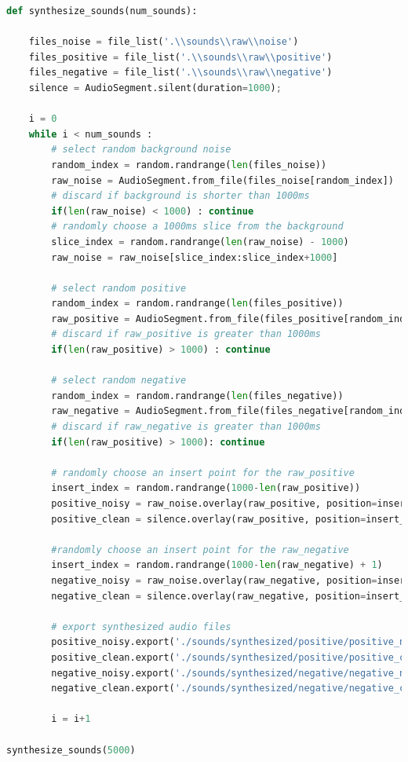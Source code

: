 \documentclass[conference]{IEEEtran}
\begin{document}
\begin{lstlisting}[language=Python]
def synthesize_sounds(num_sounds):  
    
    files_noise = file_list('.\\sounds\\raw\\noise')
    files_positive = file_list('.\\sounds\\raw\\positive')
    files_negative = file_list('.\\sounds\\raw\\negative')
    silence = AudioSegment.silent(duration=1000);

    i = 0
    while i < num_sounds :
        # select random background noise
        random_index = random.randrange(len(files_noise))
        raw_noise = AudioSegment.from_file(files_noise[random_index])
        # discard if background is shorter than 1000ms
        if(len(raw_noise) < 1000) : continue
        # randomly choose a 1000ms slice from the background
        slice_index = random.randrange(len(raw_noise) - 1000)
        raw_noise = raw_noise[slice_index:slice_index+1000]

        # select random positive 
        random_index = random.randrange(len(files_positive))
        raw_positive = AudioSegment.from_file(files_positive[random_index])
        # discard if raw_positive is greater than 1000ms
        if(len(raw_positive) > 1000) : continue

        # select random negative
        random_index = random.randrange(len(files_negative))
        raw_negative = AudioSegment.from_file(files_negative[random_index])
        # discard if raw_negative is greater than 1000ms
        if(len(raw_positive) > 1000): continue

        # randomly choose an insert point for the raw_positive
        insert_index = random.randrange(1000-len(raw_positive))
        positive_noisy = raw_noise.overlay(raw_positive, position=insert_index)
        positive_clean = silence.overlay(raw_positive, position=insert_index)

        #randomly choose an insert point for the raw_negative
        insert_index = random.randrange(1000-len(raw_negative) + 1)
        negative_noisy = raw_noise.overlay(raw_negative, position=insert_index)
        negative_clean = silence.overlay(raw_negative, position=insert_index)

        # export synthesized audio files
        positive_noisy.export('./sounds/synthesized/positive/positive_noisy_' + str(i) + '.wav', format='wav')
        positive_clean.export('./sounds/synthesized/positive/positive_clean_' + str(i) + '.wav', format='wav')
        negative_noisy.export('./sounds/synthesized/negative/negative_noisy_' + str(i) + '.wav', format='wav')
        negative_clean.export('./sounds/synthesized/negative/negative_clean_' + str(i) + '.wav', format='wav')
        
        i = i+1
    
synthesize_sounds(5000)
\end{lstlisting}
\end{document}
